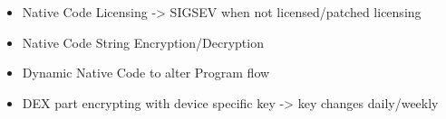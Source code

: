 


\begin{itemize}
\item Native Code Licensing -> SIGSEV when not licensed/patched licensing
\item Native Code String Encryption/Decryption
\item Dynamic Native Code to alter Program flow
\item DEX part encrypting with device specific key -> key changes daily/weekly
\end{itemize}
